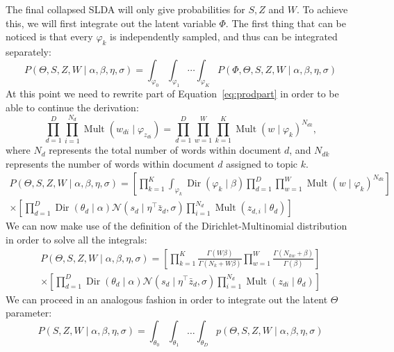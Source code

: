 \documentclass{article} %
\DeclareMathOperator{\Dir}{Dir}
\DeclareMathOperator{\Mult}{Mult}
\renewcommand{\phi}{\varphi}
\begin{document}
The final collapsed SLDA will only give probabilities for \(S, Z\) and \(W\). 
To achieve this, we will first integrate out the latent variable $\Phi$. The first thing that can be noticed is that every $\varphi_k$ is independently sampled, and thus can be integrated separately:
\begin{equation}
P(\Theta, S, Z, W \mid \alpha, \beta, \eta, \sigma) = \int_{\phi_0}\int_{\phi_1}\cdots \int_{\phi_K} P(\Phi, \Theta, S, Z, W \mid \alpha, \beta, \eta, \sigma)
\end{equation}
At this point we need to rewrite part of Equation~\ref{eq:prodpart} in order to be able to continue the derivation:
\begin{equation}
\prod_{d = 1}^D \prod_{i = 1}^{N_d} \Mult(w_{di} \mid \phi_{z_{di}}) = \prod_{d = 1}^D \prod_{w = 1}^W \prod_{k = 1}^K \Mult(w \mid \phi_k)^{N_{dk}},
\end{equation}
where $N_d$ represents the total number of words within document $d$, and $N_{dk}$ represents the number of words within document $d$ assigned to topic $k$.
\begin{equation}
\begin{gathered}
P(\Theta, S, Z, W \mid \alpha, \beta, \eta, \sigma) = \left[ \prod_{k = 1}^K \int_{\phi_k} \Dir(\phi_k \mid \beta) \prod_{d = 1}^D \prod_{w = 1}^W \Mult(w \mid \phi_k)^{N_{dk}} \right]  \\
\times\left[ \prod_{d = 1}^D \Dir(\theta_d \mid \alpha) \mathcal{N}(s_d \mid \eta^\top \bar{z}_d, \sigma) \prod_{i = 1}^{N_d} \Mult(z_{d, i} \mid \theta_d) \right]
\end{gathered}
\end{equation}
We can now make use of the definition of the Dirichlet-Multinomial distribution in order to solve all the integrals:
\begin{equation}
\begin{gathered}
P(\Theta, S, Z, W \mid \alpha, \beta, \eta, \sigma) = \left[ \prod_{k = 1}^K \frac{ \Gamma(W\beta)}{\Gamma(N_k + W\beta)} \prod_{w = 1}^W \frac{\Gamma(N_{kw}+\beta)}{\Gamma(\beta)}\right]\\
\times\left[ \prod_{d = 1}^D \Dir(\theta_d \mid \alpha) \mathcal{N}(s_d \mid \eta^\top \bar{z}_d, \sigma) \prod_{i = 1}^{N_d} \Mult(z_{di} \mid \theta_d) \right]
\end{gathered}
\end{equation}
We can proceed in an analogous fashion in order to integrate out the latent $\Theta$ parameter:
\begin{equation}
P(S, Z, W \mid \alpha, \beta, \eta, \sigma) = \int_{\theta_0}\int_{\theta_1}\dots \int_{\theta_D} p(\Theta, S, Z, W \mid \alpha, \beta, \eta, \sigma)
\end{equation}
\end{document}
